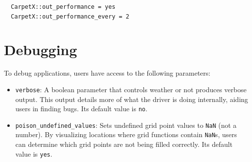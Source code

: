 \begin{verbatim}
  CarpetX::out_performance = yes  
  CarpetX::out_performance_every = 2
\end{verbatim}

\section{Debugging}
\label{sec:debugging}

To debug \CarpetX\space applications, users have access to the following parameters: 
%
\begin{itemize}
    \item \texttt{verbose}: A boolean parameter that controls weather or not \CarpetX\space produces verbose output. This output details more of what the driver is doing internally, aiding users in finding bugs. Its default value is \texttt{no}.

    \item \texttt{poison\_undefined\_values}: Sets undefined grid point values to \texttt{NaN} (not a number). By visualizing locations where grid functions contain \texttt{NaN}s, users can determine which grid points are not being filled correctly. Its default value is \texttt{yes}.
\end{itemize}






